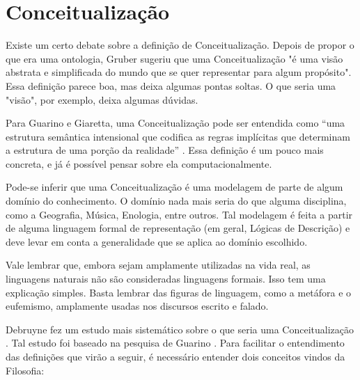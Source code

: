 \section{Conceitualização}
	
Existe um certo debate sobre a definição de Conceitualização. Depois de propor o que era uma ontologia, Gruber sugeriu que uma Conceitualização "é uma visão abstrata e simplificada do mundo que se quer representar para algum propósito". Essa definição parece boa, mas deixa algumas pontas soltas. O que seria uma "visão", por exemplo, deixa algumas dúvidas.

Para Guarino e Giaretta, uma Conceitualização pode ser entendida como “uma estrutura semântica intensional que codifica as regras implícitas que determinam a estrutura de uma porção da realidade” \citep{ontoGiaretta}. Essa definição é um pouco mais concreta, e já é possível pensar sobre ela computacionalmente.

Pode-se inferir que uma Conceitualização é uma modelagem de parte de algum domínio do conhecimento. O domínio nada mais seria do que alguma disciplina, como a Geografia, Música, Enologia, entre outros. Tal modelagem é feita a partir de alguma linguagem formal de representação (em geral, Lógicas de Descrição) e deve levar em conta a generalidade que se aplica ao domínio escolhido.

Vale lembrar que, embora sejam amplamente utilizadas na vida real, as linguagens naturais não são consideradas linguagens formais. Isso tem uma explicação simples. Basta lembrar das figuras de linguagem, como a metáfora e o eufemismo, amplamente usadas nos discursos escrito e falado. 

Debruyne fez um estudo mais sistemático sobre o que seria uma Con\-cei\-tu\-a\-li\-za\-ção \citep{ontoDebruyne}. Tal estudo foi baseado na pesquisa de Guarino \citep{ontoGuarino}. Para facilitar o entendimento das definições que virão a seguir, é necessário entender dois conceitos vindos da Filosofia:

